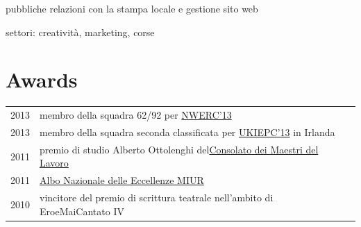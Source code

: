 \documentclass[a4paper]{deedy-resume} %
\begin{document}
\begin{minipage}[t]{0.66\textwidth}
\begin{tightitemize}
\item pubbliche relazioni con la stampa locale e gestione sito web
\end{tightitemize}

\sectionspace %



\begin{tightitemize}
\item settori: creatività, marketing, corse
\end{tightitemize}

\sectionspace %


\section{Awards} 

\begin{tabular}{rll}
2013	 & membro della squadra 62/92 per \href{http://www.nwerc.eu/}{NWERC'13}\\
2013	 & membro della squadra seconda classificata per \href{http://www.cs.nott.ac.uk/~mlw/ukiepc/}{UKIEPC'13} in Irlanda\\
2011	 & premio di studio Alberto Ottolenghi del\href{http://www.maestrilavoro.it/index/elenco_consolati/it-toscana-pisa.html}{Consolato dei Maestri del Lavoro}\\
2011	 & \href{http://www.indire.it/eccellenze/}{Albo Nazionale delle Eccellenze MIUR}\\
2010	 & vincitore del premio di scrittura teatrale nell'ambito di EroeMaiCantato IV\\
\end{tabular}

\sectionspace %


\end{minipage} %
\end{document}
